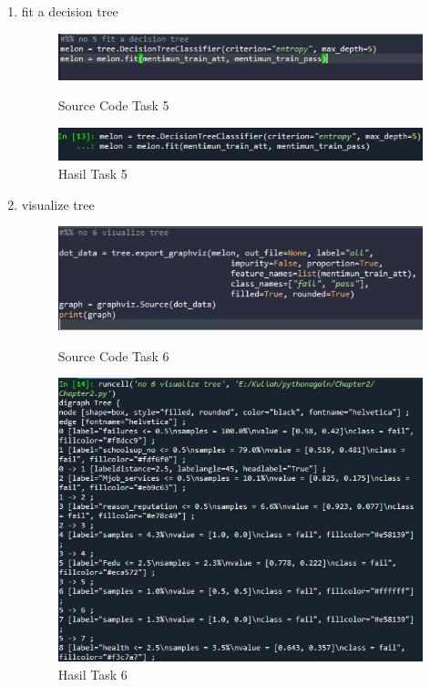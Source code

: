 \begin{enumerate}
\newpage
\item fit a decision tree
\begin{figure}[!htbp]
    \centering
    \includegraphics[scale=0.5]{figures/Chap5-1.JPG}
	\caption{Source Code Task 5}
	
    \includegraphics[scale=0.5]{figures/Chap5-1.1.JPG}
	\caption{Hasil Task 5}
\end{figure}


\item visualize tree
\begin{figure}[!htbp]
    \centering
    \includegraphics[scale=0.5]{figures/Chap6-1.JPG}
	\caption{Source Code Task 6}
    \includegraphics[scale=0.5]{figures/Chap6-1.1.JPG}
	\caption{Hasil Task 6}
\end{figure}


\end{enumerate}
